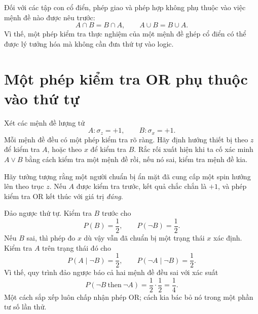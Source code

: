 Đối với các tập con cổ điển, phép giao và phép hợp không phụ thuộc vào việc mệnh đề nào được nêu trước:
\[
A\cap B=B\cap A,\qquad A\cup B=B\cup A.
\]
Vì thế, một phép kiểm tra thực nghiệm của một mệnh đề ghép cổ điển có thể được lý tưởng hóa mà không cần đưa thứ tự vào logic.

\section{Một phép kiểm tra OR phụ thuộc vào thứ tự}

Xét các mệnh đề lượng tử
\begin{equation}
A:\sigma_z=+1,\qquad B:\sigma_x=+1.
\end{equation}
Mỗi mệnh đề đều có một phép kiểm tra rõ ràng. Hãy định hướng thiết bị theo \(z\) để kiểm tra \(A\), hoặc theo \(x\) để kiểm tra \(B\). Rắc rối xuất hiện khi ta cố xác minh \(A\lor B\) bằng cách kiểm tra một mệnh đề rồi, nếu nó sai, kiểm tra mệnh đề kia.

Hãy tưởng tượng rằng một người chuẩn bị ẩn mặt đã cung cấp một spin hướng lên theo trục \(z\). Nếu \(A\) được kiểm tra trước, kết quả chắc chắn là \(+1\), và phép kiểm tra OR kết thúc với giá trị \emph{đúng}.

Đảo ngược thứ tự. Kiểm tra \(B\) trước cho
\[
P(B)=\frac12,\qquad P(\neg B)=\frac12.
\]
Nếu \(B\) sai, thì phép đo \(x\) dù vậy vẫn đã chuẩn bị một trạng thái \(x\) xác định. Kiểm tra \(A\) trên trạng thái đó cho
\[
P(A\mid \neg B)=\frac12,\qquad
P(\neg A\mid \neg B)=\frac12.
\]
Vì thế, quy trình đảo ngược báo cả hai mệnh đề đều sai với xác suất
\begin{equation}
P(\neg B\ \text{then}\ \neg A)
=\frac12\cdot\frac12=\frac14.
\end{equation}
Một cách sắp xếp luôn chấp nhận phép OR; cách kia bác bỏ nó trong một phần tư số lần thử.

\begin{classroomqa}
\end{classroomqa}

\begin{classroomqa}
\end{classroomqa}

